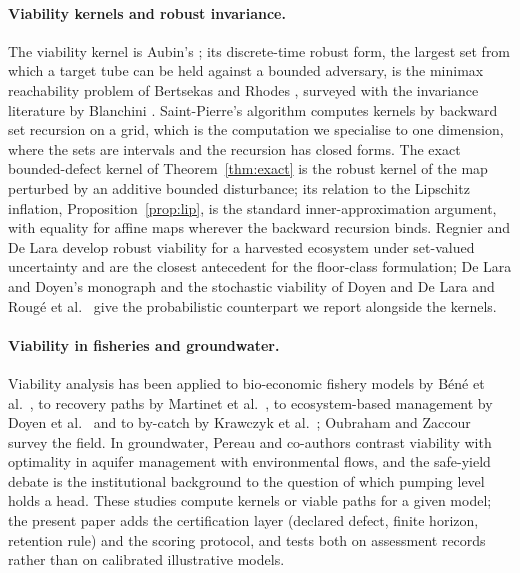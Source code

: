 \documentclass[11pt,a4paper]{article}
\theoremstyle{plain}
\theoremstyle{definition}
\theoremstyle{remark}
\begin{document}
\paragraph{Viability kernels and robust invariance.}
The viability kernel is Aubin's \cite{Aubin1991}; its discrete-time robust form, the largest set from which a target tube can be held against a bounded adversary, is the minimax reachability problem of Bertsekas and Rhodes \cite{BertsekasRhodes1971,Bertsekas1972}, surveyed with the invariance literature by Blanchini \cite{Blanchini1999}. Saint-Pierre's algorithm \cite{SaintPierre1994} computes kernels by backward set recursion on a grid, which is the computation we specialise to one dimension, where the sets are intervals and the recursion has closed forms. The exact bounded-defect kernel of Theorem~\ref{thm:exact} is the robust kernel of the map perturbed by an additive bounded disturbance; its relation to the Lipschitz inflation, Proposition~\ref{prop:lip}, is the standard inner-approximation argument, with equality for affine maps wherever the backward recursion binds. Regnier and De Lara \cite{RegnierDeLara2015} develop robust viability for a harvested ecosystem under set-valued uncertainty and are the closest antecedent for the floor-class formulation; De Lara and Doyen's monograph \cite{DeLaraDoyen2008} and the stochastic viability of Doyen and De Lara \cite{DoyenDeLara2010} and Rougé et al.\ \cite{Rouge2013} give the probabilistic counterpart we report alongside the kernels.

\paragraph{Viability in fisheries and groundwater.}
Viability analysis has been applied to bio-economic fishery models by Béné et al.\ \cite{Bene2001}, to recovery paths by Martinet et al.\ \cite{Martinet2007}, to ecosystem-based management by Doyen et al.\ \cite{Doyen2012} and to by-catch by Krawczyk et al.\ \cite{Krawczyk2013,KrawczykPharo2013}; Oubraham and Zaccour \cite{Oubraham2018} survey the field. In groundwater, Pereau and co-authors \cite{Pereau2018,Pereau2019} contrast viability with optimality in aquifer management with environmental flows, and the safe-yield debate \cite{Alley1999,Alley2004,Sophocleous1997,Sophocleous2000,Devlin2005} is the institutional background to the question of which pumping level holds a head. These studies compute kernels or viable paths for a given model; the present paper adds the certification layer (declared defect, finite horizon, retention rule) and the scoring protocol, and tests both on assessment records rather than on calibrated illustrative models.
\end{document}
